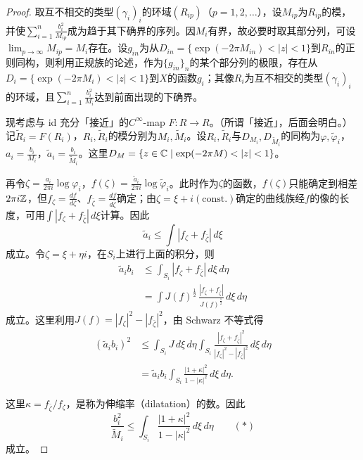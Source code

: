 \begin{proof}
取互不相交的类型$(\gamma_i)_i$的环域$(R_{ip})$（$p=1,2,\dots$），设$M_{ip}$为$R_{ip}$的模，并使$\sum_{i=1}^n\frac{b_i^2}{M_{ip}}$成为趋于其下确界的序列。因$M_i$有界，故必要时取其部分列，可设$\lim_{p\to\infty}M_{ip}=M_i$存在。设$g_{in}$为从$D_{in}=\{\exp(-2\pi M_{in})<|z|<1\}$到$R_{in}$的正则同构，则利用正规族的论述，作为$\{g_{in}\}_n$的某个部分列的极限，存在从$D_i=\{\exp(-2\pi M_i)<|z|<1\}$到$X$的函数$g_i$；其像$R_i$为互不相交的类型$(\gamma_i)_i$的环域，且$\sum_{i=1}^n\frac{b_i^2}{M_i}$达到前面出现的下确界。

现考虑与 id 充分「接近」的$C^\infty$-map $F\colon R\to R$。（所谓「接近」，后面会明白。）记$\tilde R_i=F(R_i)$，$R_i,\tilde R_i$的模分别为$M_i,\tilde M_i$。设$R_i,\tilde R_i$与$D_{M_i},D_{\tilde M_i}$的同构为$\varphi,\tilde\varphi_i$，$a_i=\frac{b_i}{M_i}$，$\tilde a_i=\frac{b_i}{\tilde M_i}$。这里$D_M=\{z\in\C\mid\exp(-2\pi M)<|z|<1\}$。


再令$\zeta=\frac{a_i}{2\pi i}\log\varphi_i$，$f(\zeta)=\frac{\tilde a_i}{2\pi i}\log\tilde\varphi_i$。此时作为$\zeta$的函数，$f(\zeta)$只能确定到相差$2\pi i\mathbb{Z}$，但$f_\zeta=\frac{df}{d\zeta}$、$f_{\bar\zeta}=\frac{df}{d\bar\zeta}$确定；由$\zeta=\xi+i(\text{const.})$确定的曲线族经$f$的像的长度，可用$\int|f_\zeta+f_{\bar\zeta}|\,d\xi$计算。因此
\[
\tilde a_i\le\int|f_\zeta+f_{\bar\zeta}|\,d\xi
\]
成立。令$\zeta=\xi+\eta i$，在$S_i$上进行上面的积分，则
\[
\begin{aligned}
\tilde a_ib_i&\le\int_{S_i}|f_\zeta+f_{\bar\zeta}|\,d\xi\,d\eta\\
&=\int J(f)^{\frac12}\,\frac{|f_\zeta+f_{\bar\zeta}|}{J(f)^{\frac12}}\,d\xi\,d\eta
\end{aligned}
\]
成立。这里利用$J(f)=|f_\zeta|^2-|f_{\bar\zeta}|^2$，由 Schwarz 不等式得
\[
\begin{aligned}
(\tilde a_ib_i)^2&\le\int_{S_i}J\,d\xi\,d\eta\int_{S_i}
 \frac{|f_\zeta+f_{\bar\zeta}|^2}{|f_\zeta|^2-|f_{\bar\zeta}|^2}\,d\xi\,d\eta\\
&=\tilde a_ib_i\int_{S_i}\frac{|1+\kappa|^2}{1-|\kappa|^2}\,d\xi\,d\eta.
\end{aligned}
\]

这里$\kappa=f_{\bar\zeta}/f_\zeta$，是称为伸缩率（dilatation）的数。因此
\[
\frac{b_i^2}{\tilde M_i}\le\int_{S_i}\frac{|1+\kappa|^2}{1-|\kappa|^2}\,d\xi\,d\eta\qquad(\ast)
\]
成立。


\end{proof}
